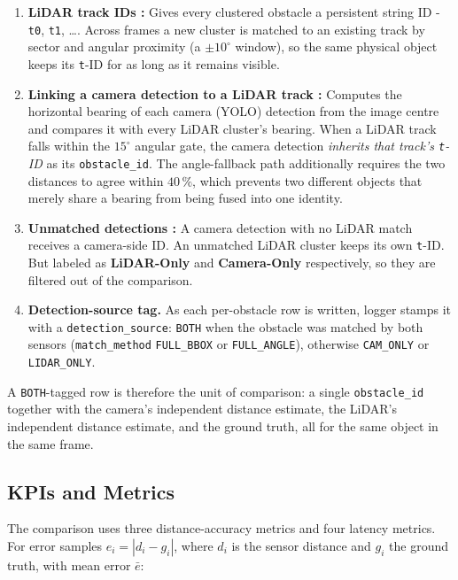 \documentclass[12pt, a4paper]{report}
\begin{document}
\begin{enumerate}
    \item \textbf{LiDAR track IDs :} Gives every clustered obstacle a
    persistent string ID - \texttt{t0}, \texttt{t1}, \dots. Across frames a new cluster is matched to an
    existing track by sector and angular proximity (a $\pm10^\circ$ window), 
    so the same physical object keeps its \texttt{t}-ID
    for as long as it remains visible.

    \item \textbf{Linking a camera detection to a LiDAR track :}
    Computes the
    horizontal bearing of each camera (YOLO) detection from the image centre and
    compares it with every LiDAR cluster's bearing. When a LiDAR track falls
    within the $15^\circ$ angular gate, the
    camera detection \emph{inherits that track's \texttt{t}-ID} as its
    \texttt{obstacle\_id}. The angle-fallback path additionally requires the two
    distances to agree within $40\,\%$, which prevents two different objects
    that merely share a bearing from being fused into one identity.

    \item \textbf{Unmatched detections :} A camera detection with no LiDAR match
    receives a camera-side ID. An unmatched LiDAR cluster keeps
    its own \texttt{t}-ID. But labeled as \textbf{LiDAR-Only} and 
    \textbf{Camera-Only} respectively, so they are filtered out of the comparison.

    \item \textbf{Detection-source tag.} As each per-obstacle row is written,
    logger stamps it with a
    \texttt{detection\_source}: \texttt{BOTH} when the obstacle was matched by
    both sensors (\texttt{match\_method} \texttt{FULL\_BBOX} or
    \texttt{FULL\_ANGLE}), otherwise \texttt{CAM\_ONLY} or \texttt{LIDAR\_ONLY}.
\end{enumerate}

A \texttt{BOTH}-tagged row is therefore the unit of comparison: a single
\texttt{obstacle\_id} together with the camera's independent distance estimate,
the LiDAR's independent distance estimate, and the ground truth, all for the
same object in the same frame.

\subsection{KPIs and Metrics}

The comparison uses three distance-accuracy metrics and four latency metrics.
For error samples $e_i = |d_i - g_i|$, where $d_i$ is the sensor distance and
$g_i$ the ground truth, with mean error $\bar{e}$:
\end{document}
